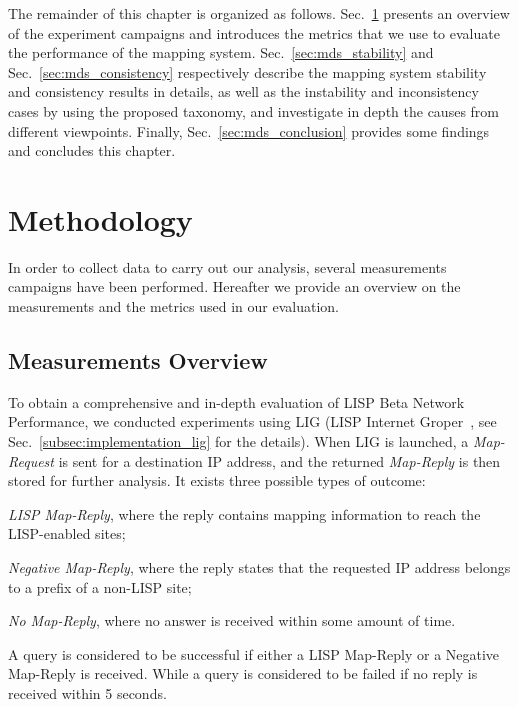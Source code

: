 The remainder of this chapter is organized as follows. Sec.~\ref{sec:mds_methodology} presents an overview of the experiment campaigns and introduces the metrics that we use to evaluate the performance of the mapping system. Sec.~\ref{sec:mds_stability} and Sec.~\ref{sec:mds_consistency} respectively describe the mapping system stability and consistency results in details, as well as the instability and inconsistency cases by using the proposed taxonomy, and investigate in depth the causes from different viewpoints. Finally, Sec.~\ref{sec:mds_conclusion} provides some findings and concludes this chapter.

\section{Methodology}
\label{sec:mds_methodology}
In order to collect data to carry out our analysis, several measurements campaigns have been performed. Hereafter we provide an overview on the measurements and the metrics used in our evaluation.

\subsection{Measurements Overview}
\label{sec:mds_overview}
To obtain a comprehensive and in-depth evaluation of LISP Beta Network Performance, we conducted experiments using LIG (LISP Internet Groper~\cite{rfc6835}, see Sec.~\ref{subsec:implementation_lig} for the details). When LIG is launched, a \emph{Map-Request} is sent for a destination IP address, and the returned \emph{Map-Reply} is then stored for further analysis. It exists three possible types of outcome: 
\begin{inparaenum}[(i)]
	\item \emph{LISP Map-Reply}, where the reply contains mapping
	information to reach the LISP-enabled sites;
	\item \emph{Negative Map-Reply}, where the reply states that the requested IP address belongs to a prefix of a non-LISP site;
	\item \emph{No Map-Reply}, where no answer is received within some
amount of time.
\end{inparaenum}
A query is considered to be successful if either a LISP Map-Reply or a Negative Map-Reply is received. While a query is considered to be failed if no reply is received within 5 seconds. 

